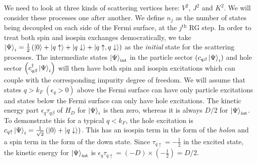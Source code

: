 We need to look at three kinds of scattering vertices here: \(V^2\), \(J^2\) and \(K^2\). We will consider these processes one after another. We define \(n_j\) as the number of states being decoupled on each side of the Fermi surface, at the \(j^\text{th}\) RG step. In order to treat both spin and isospin exchanges democratically, we take \(\ket{\Psi}_i = \frac{1}{2}\left(\ket{0} + \ket{q\uparrow} + \ket{q\downarrow} + \ket{q\uparrow, q\downarrow}\right) \) as the \textit{initial} state for the scattering processes. The intermediate states \(\ket{\Psi}_\text{int}\) in the particle sector \(\left(c_{q\beta}\ket{\Psi}_i\right)\) and hole sector \(\left(c^\dagger_{q\beta}\ket{\Psi}_i\right)\) will then have both spin and isospin excitations which can couple with the corresponding impurity degree of freedom. We will assume that states  \(q > k_F~\left(\epsilon_q > 0\right) \) above the Fermi surface can have only particle excitations and states below the Fermi surface can only have hole excitations. The kinetic energy part \(\epsilon_q \tau_{q\beta}\) of \(H_D\) for \(\ket{\Psi}_i\) is then zero, whereas it is always \(D/2\) for \(\ket{\Psi}_\text{int}\). To demonstrate this for a typical \(q < k_F\), the hole excitation is \(c_{q \uparrow}\ket{\Psi}_i = \frac{1}{\sqrt 2}\left(\ket{0} + \ket{q \downarrow}\right)\). This has an isospin term in the form of the \textit{holon} and a spin term in the form of the down state. Since \(\tau_{q \uparrow} = -\frac{1}{2}\) in the excited state, the kinetic energy for \(\ket{\Psi}_\text{int}\) is \(\epsilon_q \tau_{q \uparrow} = \left(-D\right)\times\left(-\frac{1}{2}\right) = D/2\).


